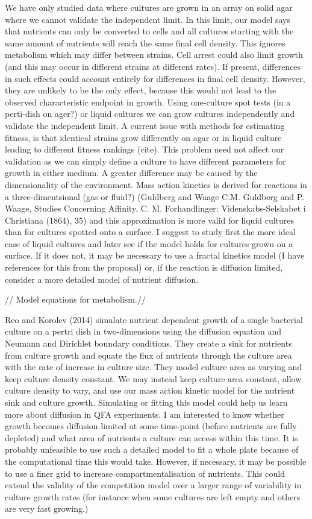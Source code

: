 We have only studied data where cultures are grown in an array on
solid agar where we cannot validate the independent limit. In this
limit, our model says that nutrients can only be converted to cells
and all cultures starting with the same amount of nutrients will reach
the same final cell density. This ignores metabolism which may differ
between strains. Cell arrest could also limit growth (and this may
occur in different strains at different rates). If present,
differences in such effects could account entirely for differences in
final cell density. However, they are unlikely to be the only effect,
because this would not lead to the observed characteristic endpoint in
growth. Using one-culture spot tests (in a perti-dish on ager?) or
liquid cultures we can grow cultures independently and validate the
independent limit. A current issue with methods for estimating
fitness, is that identical strains grow differently on agar or in
liquid culture leading to different fitness rankings (cite). This
problem need not affect our validation as we can simply define a
culture to have different parameters for growth in either medium. A
greater difference may be caused by the dimensionality of the
environment. Mass action kinetics is derived for reactions in a
three-dimentsional (gas or fluid?) (Guldberg and Waage C.M. Guldberg
and P. Waage, Studies Concerning Affinity, C. M. Forhandlinger:
Videnskabs-Selskabet i Christiana (1864), 35) and this approximation
is more valid for liquid cultures than for cultures spotted onto a
surface. I suggest to study first the more ideal case of liquid
cultures and later see if the model holds for cultures grown on a
surface. If it does not, it may be necessary to use a fractal kinetics
model (I have references for this from the proposal) or, if the
reaction is diffusion limited, consider a more detailed model of
nutrient diffusion.

// Model equations for metabolism.//

Reo and Korolev (2014) simulate nutrient dependent growth of a single
bacterial culture on a pertri dish in two-dimensions using the
diffusion equation and Neumann and Dirichlet boundary conditions. They
create a sink for nutrients from culture growth and equate the flux of
nutrients through the culture area with the rate of increase in
culture size. They model culture area as varying and keep culture
density constant. We may instead keep culture area constant, allow
culture density to vary, and use our mass action kinetic model for the
nutrient sink and culture growth. Simulating or fitting this model
could help us learn more about diffusion in QFA experiments. I am
interested to know whether growth becomes diffusion limited at some
time-point (before nutrients are fully depleted) and what area of
nutrients a culture can access within this time. It is probably
unfeasible to use such a detailed model to fit a whole plate because
of the computational time this would take. However, if necessary, it
may be possible to use a finer grid to increase compartmentalisation
of nutrients. This could extend the validity of the competition model
over a larger range of variability in culture growth rates (for
instance when some cultures are left empty and others are very fast
growing.)

